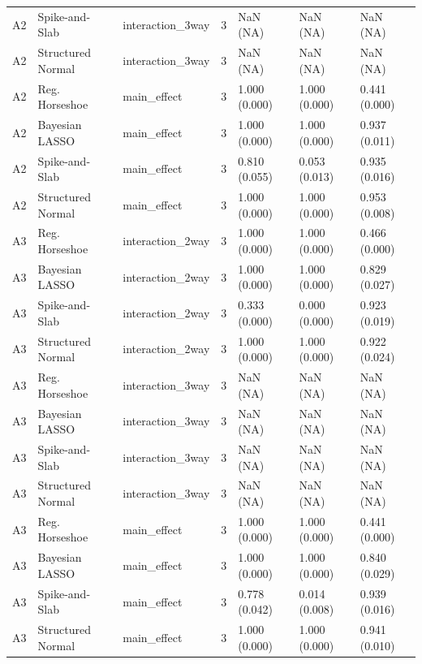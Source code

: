 \begin{tabular}{lllrlll}
  A2 & Spike-and-Slab & interaction\_3way &   3 & NaN (NA) & NaN (NA) & NaN (NA) \\ 
  A2 & Structured Normal & interaction\_3way &   3 & NaN (NA) & NaN (NA) & NaN (NA) \\ 
  A2 & Reg. Horseshoe & main\_effect &   3 & 1.000 (0.000) & 1.000 (0.000) & 0.441 (0.000) \\ 
  A2 & Bayesian LASSO & main\_effect &   3 & 1.000 (0.000) & 1.000 (0.000) & 0.937 (0.011) \\ 
  A2 & Spike-and-Slab & main\_effect &   3 & 0.810 (0.055) & 0.053 (0.013) & 0.935 (0.016) \\ 
  A2 & Structured Normal & main\_effect &   3 & 1.000 (0.000) & 1.000 (0.000) & 0.953 (0.008) \\ 
  A3 & Reg. Horseshoe & interaction\_2way &   3 & 1.000 (0.000) & 1.000 (0.000) & 0.466 (0.000) \\ 
  A3 & Bayesian LASSO & interaction\_2way &   3 & 1.000 (0.000) & 1.000 (0.000) & 0.829 (0.027) \\ 
  A3 & Spike-and-Slab & interaction\_2way &   3 & 0.333 (0.000) & 0.000 (0.000) & 0.923 (0.019) \\ 
  A3 & Structured Normal & interaction\_2way &   3 & 1.000 (0.000) & 1.000 (0.000) & 0.922 (0.024) \\ 
  A3 & Reg. Horseshoe & interaction\_3way &   3 & NaN (NA) & NaN (NA) & NaN (NA) \\ 
  A3 & Bayesian LASSO & interaction\_3way &   3 & NaN (NA) & NaN (NA) & NaN (NA) \\ 
  A3 & Spike-and-Slab & interaction\_3way &   3 & NaN (NA) & NaN (NA) & NaN (NA) \\ 
  A3 & Structured Normal & interaction\_3way &   3 & NaN (NA) & NaN (NA) & NaN (NA) \\ 
  A3 & Reg. Horseshoe & main\_effect &   3 & 1.000 (0.000) & 1.000 (0.000) & 0.441 (0.000) \\ 
  A3 & Bayesian LASSO & main\_effect &   3 & 1.000 (0.000) & 1.000 (0.000) & 0.840 (0.029) \\ 
  A3 & Spike-and-Slab & main\_effect &   3 & 0.778 (0.042) & 0.014 (0.008) & 0.939 (0.016) \\ 
  A3 & Structured Normal & main\_effect &   3 & 1.000 (0.000) & 1.000 (0.000) & 0.941 (0.010) \\ 
   \hline
\end{tabular}

